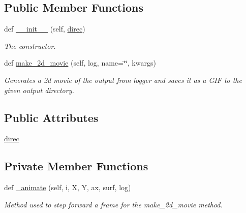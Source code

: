 \subsection*{Public Member Functions}
\begin{DoxyCompactItemize}
\item 
def \hyperlink{classMain__PDE__Repo_1_1src_1_1vis__gif__2d_1_1VisGif2d_ac831ff56d31525f11311e5b6e4c894a6}{\+\_\+\+\_\+init\+\_\+\+\_\+} (self, \hyperlink{classMain__PDE__Repo_1_1src_1_1vis__gif__2d_1_1VisGif2d_a48a438a24012dc8496b8008ab4f13da0}{direc})
\begin{DoxyCompactList}\small\item\em The constructor. \end{DoxyCompactList}\item 
def \hyperlink{classMain__PDE__Repo_1_1src_1_1vis__gif__2d_1_1VisGif2d_aa4b0092b49e7fecbc62f57adcd491c12}{make\+\_\+2d\+\_\+movie} (self, log, name=\char`\"{}\char`\"{}, kwargs)
\begin{DoxyCompactList}\small\item\em Generates a 2d movie of the output from logger and saves it as a G\+IF to the given output directory. \end{DoxyCompactList}\end{DoxyCompactItemize}
\subsection*{Public Attributes}
\begin{DoxyCompactItemize}
\item 
\hyperlink{classMain__PDE__Repo_1_1src_1_1vis__gif__2d_1_1VisGif2d_a48a438a24012dc8496b8008ab4f13da0}{direc}
\end{DoxyCompactItemize}
\subsection*{Private Member Functions}
\begin{DoxyCompactItemize}
\item 
def \hyperlink{classMain__PDE__Repo_1_1src_1_1vis__gif__2d_1_1VisGif2d_abf86f9c00a0481f04e982efbea8520ed}{\+\_\+animate} (self, i, X, Y, ax, surf, log)
\begin{DoxyCompactList}\small\item\em Method used to step forward a frame for the make\+\_\+2d\+\_\+movie method. \end{DoxyCompactList}\end{DoxyCompactItemize}


